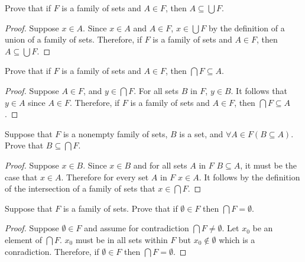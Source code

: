 \begin{tcolorbox}[title=Problem 8, breakable]
    Prove that if $F$ is a family of sets and $A \in  F$, then $A
        \subseteq  \bigcup F$.
\end{tcolorbox}

\begin{proof}
    Suppose $x \in A$. Since $x \in A$ and $A \in F$,
    $x \in \bigcup F$ by the definition of a union of 
    a family of sets. Therefore, if $F$ is a family of sets and $A \in  F$, then $A
        \subseteq  \bigcup F$.
\end{proof}

\begin{tcolorbox}[title=Problem 9, breakable]
    Prove that if $F$ is a family of sets and $A \in  F$, then
    $\bigcap F \subseteq  A$.
\end{tcolorbox}

\begin{proof}
    Suppose $A \in F$, and $y \in \bigcap F$. For all sets $B$
    in $F$, $y \in B$. It follows that $y \in A$ since $A \in F$. 
    Therefore, if $F$ is a family of sets and $A \in  F$, then
    $\bigcap F \subseteq  A$.
\end{proof}

\begin{tcolorbox}[title=Problem 10, breakable]
    Suppose that $F$ is a nonempty family of sets, $B$ is a
    set, and $\forall{A} \in  F (B \subseteq  A)$. Prove that $B \subseteq  \bigcap F$.
\end{tcolorbox}

\begin{proof}
    Suppose $x \in B$. Since $x \in B$ and for all sets $A$ in $F$ $B \subseteq  A$, it must 
    be the case that $x \in A$. Therefore for every set $A$ in $F$ $x \in A$. 
    It follows by the definition of the intersection of a family of sets 
    that $x \in \bigcap F$.
\end{proof}

\begin{tcolorbox}[title=Problem 11, breakable]
    Suppose that $F$ is a family of sets. Prove that if $\emptyset \in
        F$ then $\bigcap F = \emptyset$.
\end{tcolorbox}

\begin{proof}
    Suppose $\emptyset \in F$ and assume for contradiction $\bigcap F \not = \emptyset$.
    Let $x_0$ be an element of $\bigcap F$. $x_0$ must be in all
    sets within $F$ but $x_0 \not \in \emptyset$ which is a conradiction. 
    Therefore, if $\emptyset \in  F$ then $\bigcap F = \emptyset$.
\end{proof}

